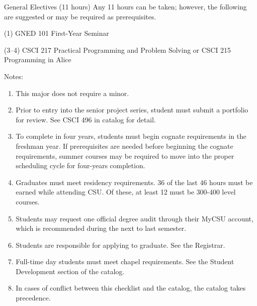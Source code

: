 \begin{reqgroup}{General Electives (11 hours)}
Any 11 hours can be taken; however, the following are suggested or may be required as prerequisites.
\begin{checklist}
\begin{minipage}[t]{\linewidth}
	\item (1)	GNED 101	First-Year Seminar
	\item (3--4)	CSCI 217	Practical Programming and Problem Solving or CSCI 215	Programming in Alice\\
	\begin{minipage}[t]{0.5\linewidth}
		\blankReq
	\end{minipage}
	\begin{minipage}[t]{0.5\linewidth}
		\blankReq
	\end{minipage}
\end{minipage}
\end{checklist}
\end{reqgroup}

Notes:%
\begin{enumerate}\footnotesize
	\item This major does not require a minor.
	\item Prior to entry into the senior project series, student must submit a portfolio for review. See CSCI 496 in catalog for detail.
	\item To complete in four years, students must begin cognate requirements in the freshman year. If prerequisites are needed before beginning the cognate requirements, summer courses may be required to move into the proper scheduling cycle for four-years completion.
	\item Graduates must meet residency requirements. 36 of the last 46 hours must be earned while attending CSU. Of these, at least 12 must be 300-400 level courses.
	\item Students may request one official degree audit through their MyCSU account, which is recommended during the next to last semester.
	\item Students are responsible for applying to graduate. See the Registrar.
	\item Full-time day students must meet chapel requirements. See the Student Development section of the catalog.
	\item In cases of conflict between this checklist and the catalog, the catalog takes precedence.
\end{enumerate}